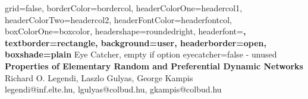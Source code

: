 \documentclass[a0paper,portrait]{baposter}
\begin{document}
\begin{poster}{
	grid=false,
	borderColor=bordercol,
	headerColorOne=headercol1,
	headerColorTwo=headercol2,
	headerFontColor=headerfontcol,
	boxColorOne=boxcolor,
	headershape=roundedright,
	headerfont=\Large\sf\bf,
	textborder=rectangle,
	background=user,
	headerborder=open,
  boxshade=plain
}
{
	Eye Catcher, empty if option eyecatcher=false - unused
}
{\sf\bf
	Properties of Elementary Random and Preferential Dynamic Networks
}
{
	\vspace{1em} Richard O. Legendi, Laszlo Gulyas, George Kampis\\
	{\smaller legendi@inf.elte.hu, lgulyas@colbud.hu, gkampis@colbud.hu}
}
{
\setlength\fboxsep{0pt}
\setlength\fboxrule{0.5pt}
}


\end{poster}
\end{document}

